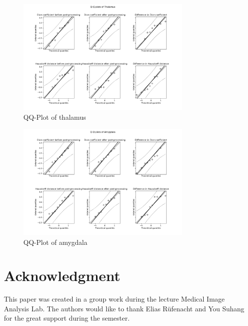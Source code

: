 \documentclass[journal]{IEEEtran}
\begin{document}
\begin{figure}[ht]
\centering
\includegraphics[width=3.4in]{MIALab_Report/img/QQ_plots_PKF/Thalamus.png}
\caption{QQ-Plot of thalamus}
\label{fig_qq_t}
\end{figure}

\begin{figure}[ht]
\centering
\includegraphics[width=3.4in]{MIALab_Report/img/QQ_plots_PKF/Amygdala.png}
\caption{QQ-Plot of amygdala}
\label{fig_qq_a}
\end{figure}




\section*{Acknowledgment}
This paper was created in a group work during the lecture Medical Image Analysis Lab. The authors would like to thank Elias Rüfenacht and You Suhang for the great support during the semester.



\ifCLASSOPTIONcaptionsoff
  \newpage
\fi
\end{document}
